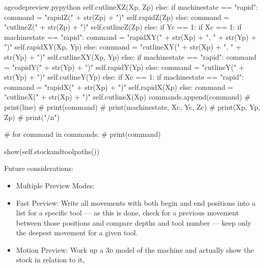 \documentclass{ltxdoc}
\begin{document}
\begin{writecode}{a}{gcodepreview.py}{python}
                                self.cutlineXZ(Xp, Zp)
                        else:
                            if machinestate == "rapid":
                                command = "rapidZ(" + str(Zp) + ")"
                                self.rapidZ(Zp)
                            else: 
                                command = "cutlineZ(" + str(Zp) + ")"
                                self.cutlineZ(Zp)
                else:
                    if Yc == 1:
                        if Xc == 1:
                            if machinestate == "rapid":
                                command = "rapidXY(" + str(Xp) + ", " + str(Yp) + ")"
                                self.rapidXY(Xp, Yp)
                            else: 
                                command = "cutlineXY(" + str(Xp) + ", " + str(Yp) + ")"
                                self.cutlineXY(Xp, Yp)
                        else:
                            if machinestate == "rapid":
                                command = "rapidY(" + str(Yp) + ")"
                                self.rapidY(Yp)
                            else: 
                                command = "cutlineY(" + str(Yp) + ")"
                                self.cutlineY(Yp)
                    else:
                        if Xc == 1:
                            if machinestate == "rapid":
                                command = "rapidX(" + str(Xp) + ")"
                                self.rapidX(Xp)
                            else: 
                                command = "cutlineX(" + str(Xp) + ")"
                                self.cutlineX(Xp)
                commands.append(command)
#                print(line)
#                print(command)
#                print(machinestate, Xc, Yc, Zc)
#                print(Xp, Yp, Zp)
#                print("/n")

#        for command in commands:
#            print(command)

        show(self.stockandtoolpaths())

\end{writecode}
\addtocounter{gcpy}{137}

Future considerations:

\begin{itemize}
\item Multiple Preview Modes:
\item Fast Preview: Write all movements with both begin and end positions into a list for a specific tool --- as this is done, check for a previous movement between those positions and compare depths and tool number --- keep only the deepest movement for a given tool.
\item Motion Preview: Work up a \textsc{3d} model of the machine and actually show the stock in relation to it, 
\end{itemize}
\end{document}
